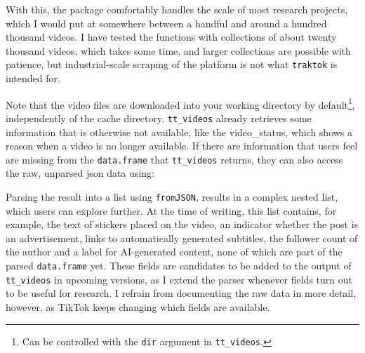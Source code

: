 \documentclass[
  nobib]{ccr}
\newenvironment{Shaded}{\begin{snugshade}}{\end{snugshade}}
\newcommand{\AttributeTok}[1]{\textcolor[rgb]{0.40,0.45,0.13}{#1}}
\newcommand{\CommentTok}[1]{\textcolor[rgb]{0.37,0.37,0.37}{#1}}
\newcommand{\DecValTok}[1]{\textcolor[rgb]{0.68,0.00,0.00}{#1}}
\newcommand{\FunctionTok}[1]{\textcolor[rgb]{0.28,0.35,0.67}{#1}}
\newcommand{\NormalTok}[1]{\textcolor[rgb]{0.00,0.23,0.31}{#1}}
\newcommand{\OtherTok}[1]{\textcolor[rgb]{0.00,0.23,0.31}{#1}}
\newcommand{\SpecialCharTok}[1]{\textcolor[rgb]{0.37,0.37,0.37}{#1}}
\newcommand{\StringTok}[1]{\textcolor[rgb]{0.13,0.47,0.30}{#1}}
\newcounter{none} %
\begin{document}
\begin{Shaded}
\end{Shaded}

With this, the package comfortably handles the scale of most research
projects, which I would put at somewhere between a handful and around a
hundred thousand videos. I have tested the functions with collections of
about twenty thousand videos, which takes some time, and larger
collections are possible with patience, but industrial-scale scraping of
the platform is not what \texttt{traktok} is intended for.

Note that the video files are downloaded into your working directory by
default\footnote{Can be controlled with the \texttt{dir} argument in
  \texttt{tt\_videos}.}, independently of the cache directory.
\texttt{tt\_videos} already retrieves some information that is otherwise
not available, like the video\_status, which shows a reason when a video
is no longer available. If there are information that users feel are
missing from the \texttt{data.frame} that \texttt{tt\_videos} returns,
they can also access the raw, unparsed json data using:

\begin{Shaded}
\end{Shaded}

Parsing the result into a list using \texttt{fromJSON}, results in a
complex nested list, which users can explore further. At the time of
writing, this list contains, for example, the text of stickers placed on
the video, an indicator whether the post is an advertisement, links to
automatically generated subtitles, the follower count of the author and
a label for AI-generated content, none of which are part of the parsed
\texttt{data.frame} yet. These fields are candidates to be added to the
output of \texttt{tt\_videos} in upcoming versions, as I extend the
parser whenever fields turn out to be useful for research. I refrain
from documenting the raw data in more detail, however, as TikTok keeps
changing which fields are available.
\end{document}
